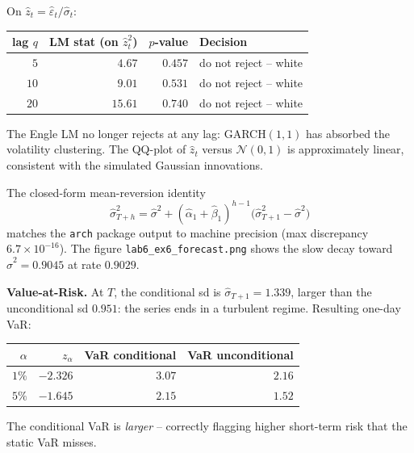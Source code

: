 \documentclass[a4paper,11pt]{article}
\begin{document}
\begin{solution}
On $\widehat z_t = \widehat\varepsilon_t / \widehat\sigma_t$:
\begin{center}
\begin{tabular}{rrrl}
\toprule
lag $q$ & LM stat (on $\widehat z_t^2$) & $p$-value & Decision \\
\midrule
$5$    & $4.67$  & $0.457$ & do not reject -- white \\
$10$   & $9.01$  & $0.531$ & do not reject -- white \\
$20$   & $15.61$ & $0.740$ & do not reject -- white \\
\bottomrule
\end{tabular}
\end{center}
The Engle LM no longer rejects at any lag: GARCH$(1, 1)$ has
absorbed the volatility clustering. The QQ-plot of
$\widehat z_t$ versus $\mathcal N(0, 1)$ is approximately linear,
consistent with the simulated Gaussian innovations.
\end{solution}

\begin{exercise}\end{exercise}

\begin{solution}
The closed-form mean-reversion identity
\[
  \widehat\sigma_{T+h}^2
  = \widehat\sigma^2
  + (\widehat\alpha_1 + \widehat\beta_1)^{h - 1}
        \bigl(\widehat\sigma_{T+1}^2 - \widehat\sigma^2\bigr)
\]
matches the \texttt{arch} package output to machine precision (max
discrepancy $6.7 \times 10^{-16}$). The figure
\texttt{lab6\_ex6\_forecast.png} shows the slow decay
toward $\widehat\sigma^2 = 0.9045$ at rate
$0.9029$.

\textbf{Value-at-Risk.} At $T$, the conditional sd is
$\widehat\sigma_{T+1} = 1.339$, larger than the unconditional sd
$0.951$: the series ends in a turbulent regime. Resulting
one-day VaR:
\begin{center}
\begin{tabular}{rrrr}
\toprule
$\alpha$ & $z_\alpha$ & VaR conditional & VaR unconditional \\
\midrule
$1\%$ & $-2.326$ & $3.07$ & $2.16$ \\
$5\%$ & $-1.645$ & $2.15$ & $1.52$ \\
\bottomrule
\end{tabular}
\end{center}
The conditional VaR is \emph{larger} -- correctly flagging higher
short-term risk that the static VaR misses.
\end{solution}
\end{document}
